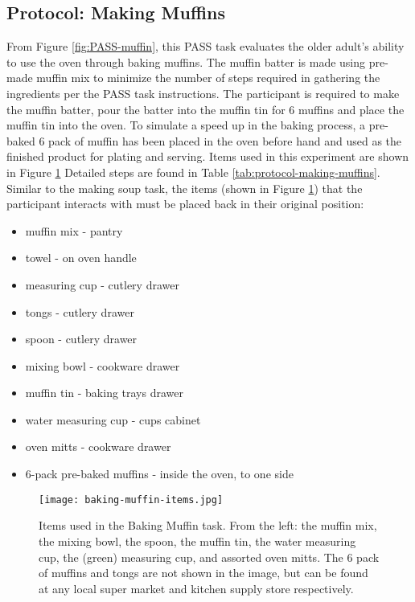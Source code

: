 \clearpage
\subsection{Protocol: Making Muffins}
From Figure \ref{fig:PASS-muffin}, this PASS task evaluates the older adult's ability to use the oven through baking muffins. The muffin batter is made using pre-made muffin mix to minimize the number of steps required in gathering the ingredients per the PASS task instructions. The participant is required to make the muffin batter, pour the batter into the muffin tin for 6 muffins and place the muffin tin into the oven. To simulate a speed up in the baking process, a pre-baked 6 pack of muffin has been placed in the oven before hand and used as the finished product for plating and serving. Items used in this experiment are shown in Figure \ref{fig:PASS-muffin-items} Detailed steps are found in Table \ref{tab:protocol-making-muffins}. Similar to the making soup task, the items (shown in Figure \ref{fig:PASS-muffin-items}) that the participant interacts with must be placed back in their original position:

\begin{itemize}
    \item muffin mix - pantry
    \item towel - on oven handle
    \item measuring cup - cutlery drawer
    \item tongs - cutlery drawer
    \item spoon - cutlery drawer
    \item mixing bowl - cookware drawer
    \item muffin tin - baking trays drawer
    \item water measuring cup - cups cabinet
    \item oven mitts - cookware drawer
    \item 6-pack pre-baked muffins - inside the oven, to one side
\end{itemize}

\begin{figure}[ht]
    \centering
    \texttt{[image: baking-muffin-items.jpg]}
    \caption{Items used in the Baking Muffin task. From the left: the muffin mix, the mixing bowl, the spoon, the muffin tin, the water measuring cup, the (green) measuring cup, and assorted oven mitts. The 6 pack of muffins and tongs are not shown in the image, but can be found at any local super market and kitchen supply store respectively.}
    \label{fig:PASS-muffin-items}
\end{figure}

